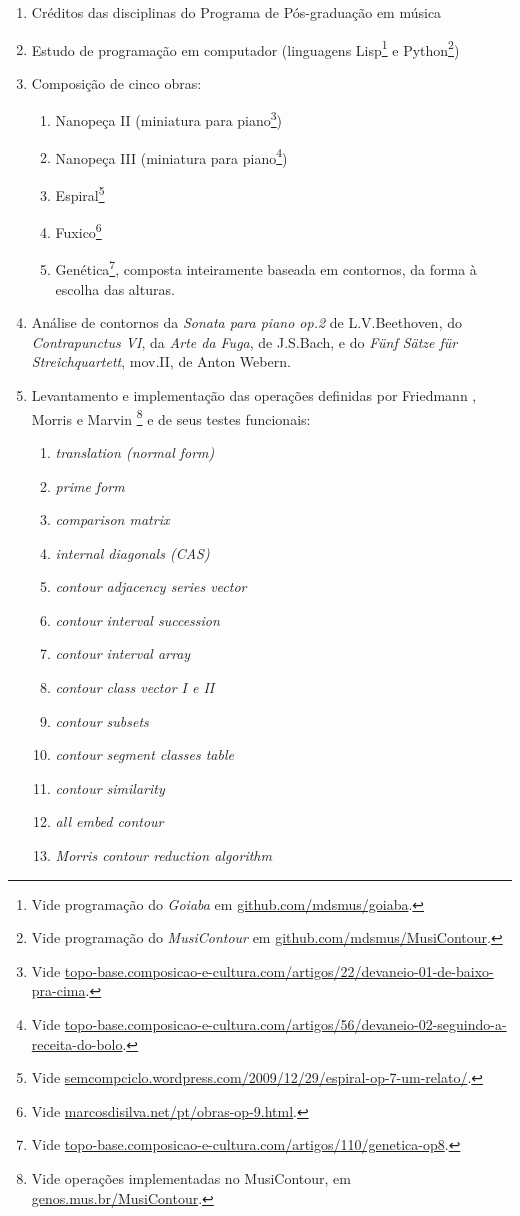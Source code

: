\documentclass[12pt]{article}
\newcommand{\eng}[1]{\textit{#1}}
\newcommand{\opus}[1]{\textit{#1}}
\begin{document}
\begin{enumerate}
\item Créditos das disciplinas do Programa de Pós-graduação em música
\item Estudo de programação em computador (linguagens
  Lisp\footnote{Vide programação do \textit{Goiaba} em
    \url{github.com/mdsmus/goiaba}.} e Python\footnote{Vide
    programação do \textit{MusiContour} em
    \url{github.com/mdsmus/MusiContour}.})
\item Composição de cinco obras:
\begin{enumerate}
\item Nanopeça II (miniatura para piano\footnote{Vide
    \url{topo-base.composicao-e-cultura.com/artigos/22/devaneio-01-de-baixo-pra-cima}.})
\item Nanopeça III (miniatura para piano\footnote{Vide
    \url{topo-base.composicao-e-cultura.com/artigos/56/devaneio-02-seguindo-a-receita-do-bolo}.})
\item Espiral\footnote{Vide
  \url{semcompciclo.wordpress.com/2009/12/29/espiral-op-7-um-relato/}.}
\item Fuxico\footnote{Vide
    \url{marcosdisilva.net/pt/obras-op-9.html}.}
\item Genética\footnote{Vide
    \url{topo-base.composicao-e-cultura.com/artigos/110/genetica-op8}.},
  composta inteiramente baseada em contornos, da forma à escolha das
  alturas.
\end{enumerate}
\item Análise de contornos da \opus{Sonata para piano op.2} de
  L.V.Beethoven, do \opus{Contrapunctus VI}, da \opus{Arte da Fuga},
  de J.S.Bach, e do \opus{Fünf Sätze für Streichquartett}, mov.II, de
  Anton Webern.
\item Levantamento e implementação das operações definidas por
  Friedmann \cite{friedmann85:methodology}, Morris
  \cite{morris93:directions} e Marvin
  \cite{marvin.ea87:relating}\footnote{Vide operações implementadas no
    MusiContour, em \url{genos.mus.br/MusiContour}.} e de seus testes
  funcionais:
  \begin{enumerate}
  \item \eng{translation (normal form)}
  \item \eng{prime form}
  \item \eng{comparison matrix}
  \item \eng{internal diagonals (CAS)}
  \item \eng{contour adjacency series vector}
  \item \eng{contour interval succession}
  \item \eng{contour interval array}
  \item \eng{contour class vector I e II}
  \item \eng{contour subsets}
  \item \eng{contour segment classes table}
  \item \eng{contour similarity}
  \item \eng{all embed contour}
  \item \eng{Morris contour reduction algorithm}
  \end{enumerate}
\end{enumerate}
\end{document}
